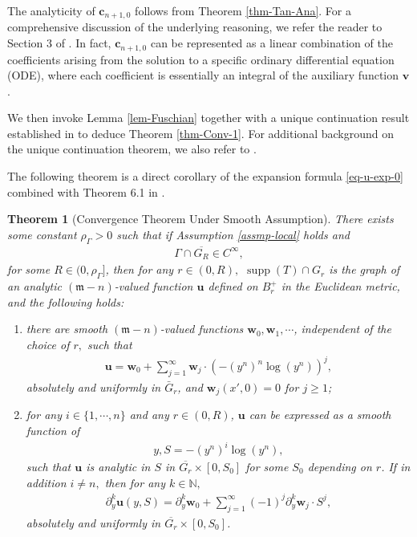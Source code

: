 \documentclass[11pt,reqno]{amsart}
\newcommand{\fm}{\mathfrak{m}}
\renewcommand{\geq}{\geqslant}
\newtheorem{theorem}{Theorem}[section]
\theoremstyle{definition}
\numberwithin{equation}{section}
\begin{document}
The analyticity of  $\mathbf{c}_{n+1,0}$ follows from Theorem \ref{thm-Tan-Ana}. For a comprehensive discussion of the underlying reasoning, we refer the reader to Section 3 of \cite{HanJiang1}. In fact, $\mathbf{c}_{n+1,0}$ can be represented as a linear combination of the coefficients arising from the solution to a specific ordinary differential equation (ODE), where each coefficient is essentially an integral of the auxiliary function $\mathbf{v}$.

We then invoke Lemma \ref{lem-Fuschian} together with a unique continuation result established in \cite{HanJiang1} to deduce Theorem \ref{thm-Conv-1}. For additional background on the unique continuation theorem, we also refer to \cite{Mazzeo}.

The following theorem is a direct corollary of the expansion formula \eqref{eq-u-exp-0} combined with Theorem 6.1 in \cite{HanJiang1}.
\begin{theorem}[Convergence Theorem Under Smooth Assumption]\label{thm-conv-2}
There exists some constant $\rho_\Gamma>0$ such that
if Assumption \ref{assmp-local} holds and 
\begin{align}
\Gamma \cap \overline {G_R} \in C^{\infty},
\end{align}
 for some $R\in (0, \rho_\Gamma]$,
then for any $r\in (0, R),$   $\operatorname{supp}(T) \cap G_r$ is the graph of an analytic $(\fm-n)$-valued function $\mathbf u$ defined on $B^+_r$ in the Euclidean metric, and the following holds:
\begin{enumerate}
\item there are smooth $(\fm-n)$-valued functions $\mathbf w_0, \mathbf w_1,\cdots$, independent of the choice of $r,$ such that
\begin{align}
    \mathbf u=\mathbf  w_0 + \sum^{\infty}_{j=1} \mathbf w_j\cdot (-(y^n)^n \log (y^n))^{j} ,
\end{align}
absolutely and uniformly in $\bar{G}_r$, 
and $\mathbf w_j(x', 0)=0$ for $j\geq 1$;

\item
for any $i\in \{1,\cdots, n\}$ and any $r\in (0, R)$,
 $\mathbf u$ can be expressed as a smooth function of
 \begin{align}
     y, S = - (y^n)^i \log (y^n),
 \end{align}
 such that $\mathbf u$ is analytic in $S$ in $\overline{G_r} \times [0, S_0]$ for some $S_0$ depending on $r$. 
If in addition $i\neq n,$
then for any $k\in \mathbb N,$
\begin{align}
    \partial^k_{y} \mathbf u(y, S) = \partial^k_{y}\mathbf w_0 +\sum^{\infty}_{j=1}(-1)^j \partial^k_{y}\mathbf w_j \cdot S^{j},
\end{align}
absolutely and uniformly in $\overline{G_r} \times [0, S_0]$.
\end{enumerate}
\end{theorem}
\end{document}
